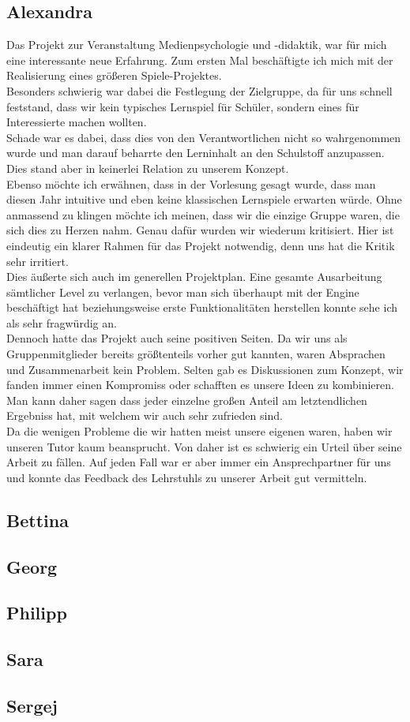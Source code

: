 \documentclass[10pt,a4paper,notitlepage]{report}
\begin{document}
	\subsection{Alexandra}
			Das Projekt zur Veranstaltung Medienpsychologie und -didaktik, war für mich eine interessante neue Erfahrung. 			Zum ersten Mal beschäftigte ich mich mit der Realisierung eines größeren Spiele-Projektes. \\
	Besonders schwierig war dabei die Festlegung der Zielgruppe, da für uns schnell feststand, dass wir kein typisches Lernspiel 			für Schüler, sondern eines für Interessierte machen wollten.\\
	Schade war es dabei, dass dies von den Verantwortlichen nicht so wahrgenommen wurde und man darauf beharrte den 				Lerninhalt an den Schulstoff anzupassen. Dies stand aber in keinerlei Relation zu unserem Konzept.\\
	Ebenso möchte ich erwähnen, dass in der Vorlesung gesagt wurde, dass man diesen Jahr intuitive und eben keine klassischen 			Lernspiele erwarten würde. Ohne anmassend zu klingen möchte ich meinen, dass wir die einzige Gruppe waren, die sich dies zu 	Herzen nahm. Genau dafür wurden wir wiederum kritisiert. Hier ist eindeutig ein klarer Rahmen für das Projekt notwendig, 			denn uns hat die Kritik sehr irritiert.\\
	Dies äußerte sich auch im generellen Projektplan. Eine gesamte Ausarbeitung sämtlicher Level zu verlangen, bevor man sich 			überhaupt mit der Engine beschäftigt hat beziehungsweise erste Funktionalitäten herstellen konnte sehe ich als sehr 				fragwürdig an.\\
	Dennoch hatte das Projekt auch seine positiven Seiten. Da wir uns als Gruppenmitglieder bereits größtenteils vorher gut 			kannten, waren Absprachen und Zusammenarbeit kein Problem. Selten gab es Diskussionen zum Konzept, wir fanden immer 			einen Kompromiss oder schafften es unsere Ideen zu kombinieren. Man kann daher sagen dass jeder einzelne großen Anteil am 	letztendlichen Ergebniss hat, mit welchem wir auch sehr zufrieden sind.\\
	Da die wenigen Probleme die wir hatten meist unsere eigenen waren, haben wir unseren Tutor kaum beansprucht. Von daher 			ist es schwierig ein Urteil über seine Arbeit zu fällen. Auf jeden Fall war er aber immer ein Ansprechpartner für uns und konnte 			das Feedback des Lehrstuhls zu unserer Arbeit gut vermitteln.\\

	\subsection{Bettina}

	\subsection{Georg}

	\subsection{Philipp}
	
	\subsection{Sara}

	\subsection{Sergej}

	\Fusszeile
\end{document}
